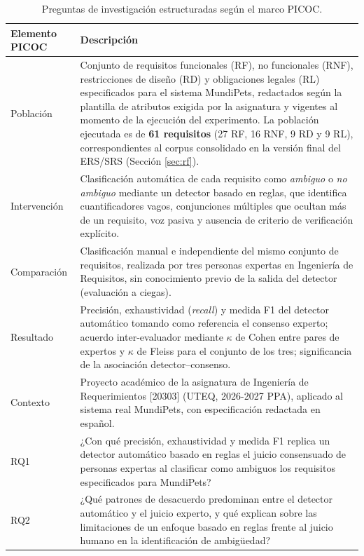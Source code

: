 \documentclass[journal,onecolumn]{IEEEtran}
\begin{document}
	\begin{table}[H]
		\centering
		\caption{Preguntas de investigación estructuradas según el marco PICOC.}
		\label{tab:picoc}
		\small
		\begin{tabularx}{\textwidth}{@{}p{2.6cm} X@{}}
			\toprule
			\textbf{Elemento PICOC} & \textbf{Descripción} \\
			\midrule
			Población & Conjunto de requisitos funcionales (RF), no funcionales
			(RNF), restricciones de diseño (RD) y obligaciones legales (RL)
			especificados para el sistema MundiPets, redactados según la
			plantilla de atributos exigida por la asignatura y vigentes al
			momento de la ejecución del experimento. La población ejecutada
			es de \textbf{61 requisitos} (27 RF, 16 RNF, 9 RD y 9 RL),
			correspondientes al corpus consolidado en la versión final del
			ERS/SRS (Sección \ref{sec:rf}). \\
			Intervención & Clasificación automática de cada requisito como
			\emph{ambiguo} o \emph{no ambiguo} mediante un detector basado en
			reglas, que identifica cuantificadores vagos, conjunciones
			múltiples que ocultan más de un requisito, voz pasiva y ausencia
			de criterio de verificación explícito. \\
			Comparación & Clasificación manual e independiente del mismo
			conjunto de requisitos, realizada por tres personas expertas en
			Ingeniería de Requisitos, sin conocimiento previo de la salida del
			detector (evaluación a ciegas). \\
			Resultado & Precisión, exhaustividad (\emph{recall}) y medida
			F1 del detector automático tomando como referencia el consenso
			experto; acuerdo inter-evaluador mediante $\kappa$ de Cohen entre
			pares de expertos y $\kappa$ de Fleiss para el conjunto de los
			tres; significancia de la asociación detector--consenso. \\
			Contexto & Proyecto académico de la asignatura de Ingeniería de
			Requerimientos [20303] (UTEQ, 2026-2027 PPA), aplicado al sistema
			real MundiPets, con especificación redactada en español. \\
			\midrule
			RQ1 & ¿Con qué precisión, exhaustividad y medida F1 replica un
			detector automático basado en reglas el juicio consensuado de
			personas expertas al clasificar como ambiguos los requisitos
			especificados para MundiPets? \\
			RQ2 & ¿Qué patrones de desacuerdo predominan entre el detector
			automático y el juicio experto, y qué explican sobre las
			limitaciones de un enfoque basado en reglas frente al juicio
			humano en la identificación de ambigüedad? \\
			\bottomrule
		\end{tabularx}
	\end{table}
	
\end{document}
